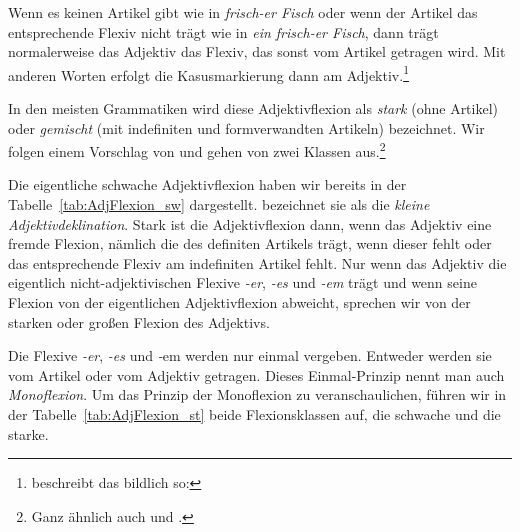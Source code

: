 Wenn es keinen Artikel gibt wie in \textit{frisch-er Fisch} oder wenn der Artikel das entsprechende Flexiv nicht trägt wie in \textit{ein frisch-er Fisch}, dann trägt normalerweise das Adjektiv das Flexiv, das sonst vom Artikel getragen wird. Mit anderen Worten erfolgt die Kasusmarkierung dann am Adjektiv.\footnote{\citet[123]{Fourquet1970} beschreibt das bildlich so: }

In den meisten Grammatiken wird diese Adjektivflexion als \textit{stark} (ohne Artikel) oder \textit{gemischt} (mit indefiniten und formverwandten Artikeln) bezeichnet. Wir folgen einem Vorschlag von \citet[55--67]{Wurzel1970} und gehen von zwei Klassen aus.\footnote{Ganz ähnlich auch \citet[628--630]{HeidolphFlaemigMotsch1981} und \citet[34]{Agel1996}.}

Die eigentliche schwache Adjektivflexion haben wir bereits in der Tabelle~\ref{tab:AdjFlexion_sw} dargestellt. \citet[483--484]{Weinrich2003} bezeichnet sie als die \textit{kleine Adjektivdeklination}. Stark ist die Adjektivflexion dann, wenn das Adjektiv eine fremde Flexion, nämlich die des definiten Artikels trägt, wenn dieser fehlt oder das entsprechende Flexiv am indefiniten Artikel fehlt. Nur wenn das Adjektiv die eigentlich nicht-adjektivischen Flexive \textit{-er}, \textit{-es} und \textit{-em} trägt und wenn seine Flexion von der eigentlichen Adjektivflexion abweicht, sprechen wir von der starken oder großen Flexion des Adjektivs. 

Die Flexive \textit{-er}, \textit{-es} und \textit-{em} werden nur einmal vergeben. Entweder werden sie vom Artikel oder vom Adjektiv getragen. Dieses Einmal-Prinzip nennt man auch \textit{Monoflexion}. Um das Prinzip der Monoflexion zu veranschaulichen, führen wir in der Tabelle~\ref{tab:AdjFlexion_st} beide Flexionsklassen auf, die schwache und die starke.

